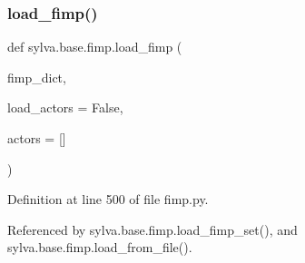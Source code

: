 \subsubsection{\texorpdfstring{load\+\_\+fimp()}{load\_fimp()}}
{\footnotesize\ttfamily def sylva.\+base.\+fimp.\+load\+\_\+fimp (\begin{DoxyParamCaption}\item[{}]{fimp\+\_\+dict,  }\item[{}]{load\+\_\+actors = {\ttfamily False},  }\item[{}]{actors = {\ttfamily \mbox{[}\mbox{]}} }\end{DoxyParamCaption})}



Definition at line 500 of file fimp.\+py.



Referenced by sylva.\+base.\+fimp.\+load\+\_\+fimp\+\_\+set(), and sylva.\+base.\+fimp.\+load\+\_\+from\+\_\+file().


